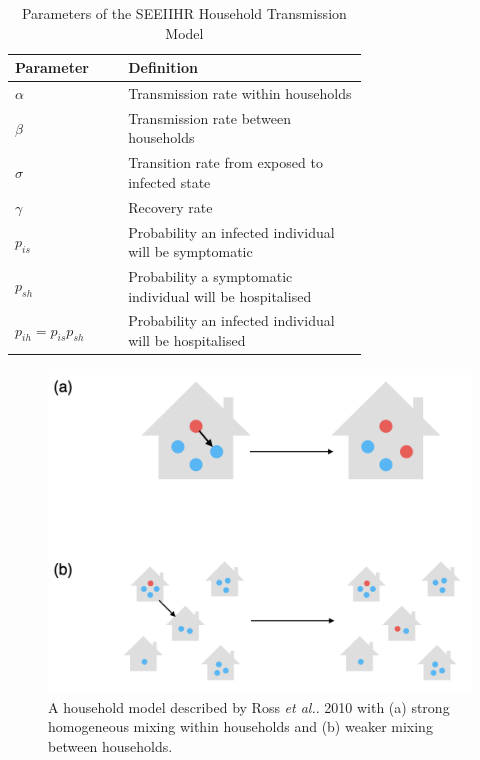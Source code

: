 \begin{table}[h!]
	\centering
	\caption{Parameters of the SEEIIHR Household Transmission Model}
	\begin{tabular}{p{0.2\linewidth}p{0.5\linewidth}}
		\toprule
		Parameter  & Definition \\
		\midrule
		$\alpha$    & Transmission rate within households \\
		$\beta$      & Transmission rate between households \\
		$\sigma$   & Transition rate from exposed to infected state \\
		$\gamma$ & Recovery rate \\
		$p_{is}$     & Probability an infected individual will be symptomatic \\
		$p_{sh}$    & Probability a symptomatic individual will be hospitalised \\
		$p_{ih} = p_{is}p_{sh}$  & Probability an infected individual will be hospitalised \\
		\bottomrule
	\end{tabular}
	\label{tab: Transmission parameters}
\end{table}

\begin{figure}[h!]
	\centering
	\includegraphics[scale=0.5]{Figs/hh_pop_model.png}
	\caption{A household model described by Ross \textit{et al.}. 2010 with (a) strong homogeneous mixing within households and (b) weaker mixing between households.}
	\label{fig:household_model}
\end{figure}


